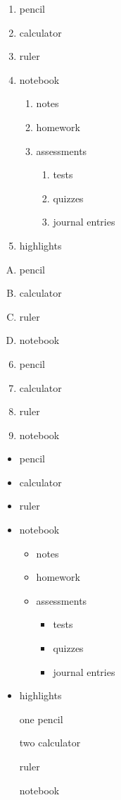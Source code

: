 \documentclass[11pt]{article}
\begin{document}
  \begin{enumerate}
    \item pencil
    \item calculator
    \item ruler
    \item notebook
    \begin{enumerate}
      \item notes
      \item homework
      \item assessments
      \begin{enumerate}
        \item tests
        \item quizzes
        \item journal entries
      \end{enumerate}
    \end{enumerate}
  \item highlights
  \end{enumerate}

  \begin{enumerate}[A.]
    \item pencil
    \item calculator
    \item ruler
    \item notebook
  \end{enumerate}

  \vspace{1cm}

  \begin{enumerate}\setcounter{enumi}{5}
    \item pencil
    \item calculator
    \item ruler
    \item notebook
  \end{enumerate}

  \pagebreak

  \begin{itemize}
    \item pencil
    \item calculator
    \item ruler
    \item notebook
    \begin{itemize}
      \item notes
      \item homework
      \item assessments
      \begin{itemize}
        \item tests
        \item quizzes
        \item journal entries
      \end{itemize}
    \end{itemize}
  \item highlights
  \end{itemize}

  \begin{enumerate}
    \item[one] pencil
    \item[two] calculator
    \item[] ruler
    \item[] notebook
  \end{enumerate}
\end{document}
